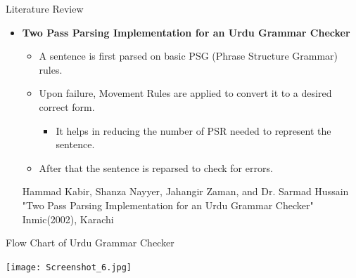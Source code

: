 \documentclass{beamer}
\begin{document}
\begin{frame}{Literature Review}
\begin{itemize}
	\vspace{0.5em}
	\item \textbf{Two Pass Parsing Implementation for an Urdu Grammar Checker} \\
	\vspace{1em}
	\begin{itemize}
		\item A sentence is first parsed on basic PSG (Phrase Structure Grammar) rules.  \\
		\vspace{0.5em}
		\item Upon failure, Movement Rules are applied to convert it to a desired correct form. \\ 
		\begin{itemize}
			\item It helps in reducing the number of PSR needed to represent the sentence.
		\end{itemize}
		\vspace{0.5em}
		\item After that the sentence is reparsed to check for errors.\\
		\vspace{2em}	
	\end{itemize}
	\footnotesize \color{blue}Hammad Kabir, Shanza Nayyer, Jahangir Zaman, and Dr. Sarmad Hussain
	\color{black} {"Two Pass Parsing Implementation for an Urdu Grammar Checker"} 
	\color{blue} Inmic(2002), Karachi
\end{itemize}
\end{frame}





\begin{frame}{Flow Chart of Urdu Grammar Checker}
\begin{center}
	\texttt{[image: Screenshot\_6.jpg]}	
\end{center}
\end{frame}
\end{document}
